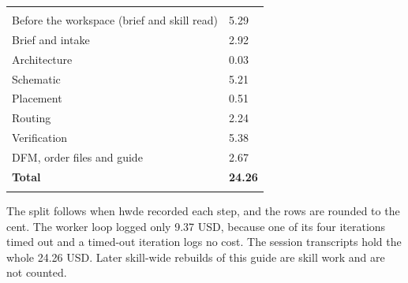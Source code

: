 \begin{hsblock}
\begin{tabularx}{\linewidth}{Y R{2.2cm}}
\hstoprule
{} &  \\
\hstoprule
Before the workspace (brief and skill read) & 5.29 \\ \hline
Brief and intake & 2.92 \\ \hline
Architecture & 0.03 \\ \hline
Schematic & 5.21 \\ \hline
Placement & 0.51 \\ \hline
Routing & 2.24 \\ \hline
Verification & 5.38 \\ \hline
DFM, order files and guide & 2.67 \\
\hstoprule
\textbf{Total} & \textbf{24.26} \\
\hstoprule
\end{tabularx}
\end{hsblock}

The split follows when hwde recorded each step, and the rows are rounded to the cent. The worker loop logged only 9.37 USD, because one of its four iterations timed out and a timed-out iteration logs no cost. The session transcripts hold the whole 24.26 USD. Later skill-wide rebuilds of this guide are skill work and are not counted.


